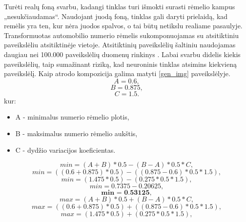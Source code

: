 \documentclass{VUMIFInfBakalaurinis}
\begin{document}
Turėti realų foną svarbu, kadangi tinklas turi išmokti surasti rėmelio kampus „nesukčiaudamas“. 
Naudojant juodą foną, tinklas gali daryti prielaidą, kad remėlis yra ten, kur nėra juodos spalvos, o tai būtų netikslu realiame pasaulyje.
Transformuotas automobilio numerio rėmelis sukomponuojamas su atsitiktiniu paveikslėliu atsitiktinėje vietoje.
Atsitiktinių paveikslėlių šaltiniu naudojamas daugiau nei 100.000 paveikslėlių duomenų rinkinys \cite{xiao2010sun}.
Labai svarbu didelis kiekis paveikslėlių, taip sumažinant riziką, kad neuroninis tinklas atsimins kiekvieną paveikslėlį.
Kaip atrodo kompozicija galima matyti \ref{gen_img} paveikslėlyje.
\begin{equation*}
  A = 0.6,
\end{equation*}
\begin{equation*}
  B = 0.875,
\end{equation*}
\begin{equation*}
  C = 1.5.
\end{equation*}
kur:
\begin{itemize}[itemsep=0.5pt]
  \item A - minimalus numerio rėmelio plotis,
  \item B - maksimalus numerio rėmelio aukštis,
  \item C - dydžio variacijos koeficientas.
\end{itemize}
\begin{equation*}
  min = (A + B) * 0.5 - (B - A) * 0.5 * C,
\end{equation*}
\begin{equation*}
  min = ((0.6 + 0.875) * 0.5) - ((0.875 - 0.6) * 0.5 * 1.5),
\end{equation*}
\begin{equation*}
  min = (1.475 * 0.5) - (0.275 * 0.5 * 1.5),
\end{equation*}
\begin{equation*}
  min = 0.7375 - 0.20625,
\end{equation*}
\begin{equation*}
  \textbf{min = 0.53125},
\end{equation*}
\begin{equation*}
  max = (A + B) * 0.5 + (B - A) * 0.5 * C,
\end{equation*}
\begin{equation*}
  max = ((0.6 + 0.875) * 0.5) + ((0.875 - 0.6) * 0.5 * 1.5),
\end{equation*}
\begin{equation*}
  max = (1.475 * 0.5) + (0.275 * 0.5 * 1.5),
\end{equation*}
\end{document}
